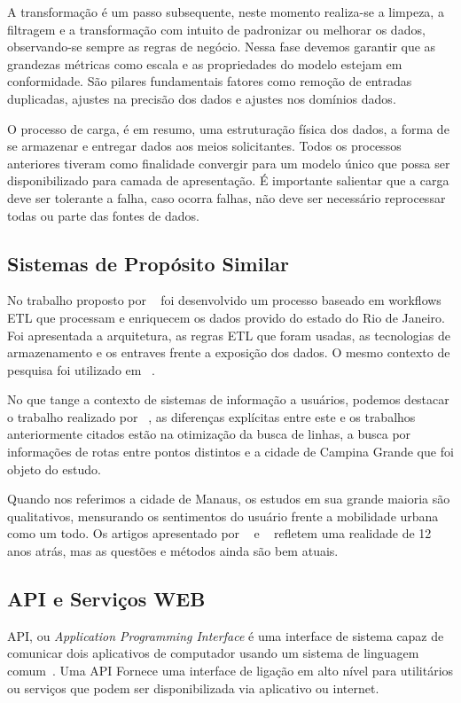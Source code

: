 \documentclass[12pt]{article}
\begin{document}
A transformação é um passo subsequente, neste momento realiza-se a limpeza, a filtragem e a transformação com intuito de padronizar ou melhorar os dados, observando-se sempre as regras de negócio. Nessa fase devemos garantir que as grandezas métricas como escala e as propriedades do modelo estejam em conformidade. São pilares fundamentais fatores como remoção de entradas duplicadas, ajustes na precisão dos dados e ajustes nos domínios dados.

O processo de carga, é em resumo, uma estruturação física dos dados, a forma de se armazenar e entregar dados aos meios solicitantes. Todos os processos anteriores tiveram como finalidade convergir para um modelo único que possa ser disponibilizado para camada de apresentação. É importante salientar que a carga deve ser tolerante a falha, caso ocorra falhas, não deve ser necessário reprocessar todas ou parte das fontes de dados.

\subsection{Sistemas de Propósito Similar}
No trabalho proposto por ~\cite{art01} foi desenvolvido um processo baseado em workflows ETL que processam e enriquecem os dados provido do estado do Rio de Janeiro. Foi apresentada a arquitetura, as regras ETL que foram usadas, as tecnologias de armazenamento e os entraves frente a exposição dos dados. O mesmo contexto de pesquisa foi utilizado em ~\cite{art02}.

No que tange a contexto de sistemas de informação a usuários, podemos destacar o trabalho realizado por ~\cite{art03}, as diferenças explícitas entre este e os trabalhos anteriormente citados estão na otimização da busca de linhas, a busca por informações de rotas entre pontos distintos e a cidade de Campina Grande que foi objeto do estudo.

Quando nos referimos a cidade de Manaus, os estudos em sua grande maioria são qualitativos, mensurando os sentimentos do usuário frente a mobilidade urbana como um todo. Os artigos apresentado por ~\cite{art11} e ~\cite{art10} refletem uma realidade de 12 anos atrás, mas as questões e métodos ainda são bem atuais.

\subsection{API e Serviços WEB} \label{sec:APIWEB}
API, ou \textit{Application Programming Interface} é uma interface de sistema capaz de comunicar dois aplicativos de computador usando um sistema de linguagem comum~\cite{site05}. Uma API Fornece uma interface de ligação em alto nível para utilitários ou serviços que podem ser disponibilizada via aplicativo ou internet.
\end{document}
